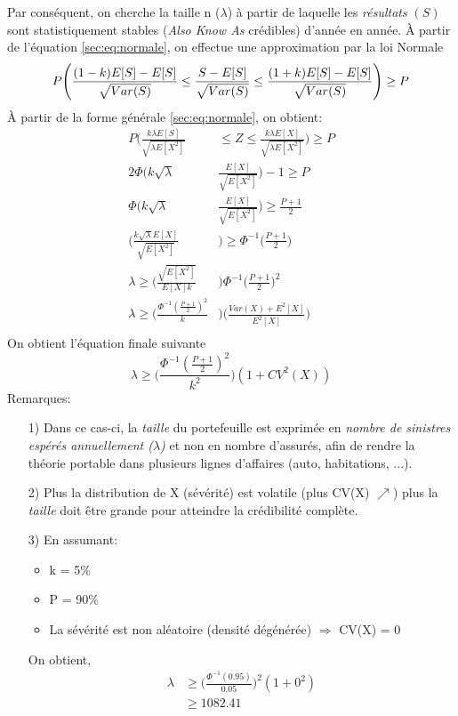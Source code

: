 Par conséquent, on cherche la taille n ($\lambda$) à partir de laquelle les \textit{résultats} $(S)$ sont statistiquement stables (\textit{Also Know As} crédibles) d'année en année. À partir de l'équation \ref{sec:eq:normale}, on effectue une approximation par la loi Normale
\begin{equation}
P\Bigg( \frac{(1 - k)E[S] - E[S]}{\sqrt{Var(S)}} \leq \frac{S - E[S]}{\sqrt{Var(S)}} \leq \frac{(1 + k)E[S] - E[S]}{\sqrt{Var(S)}}\Bigg) \geq P \\
\end{equation}
À partir de la forme générale \ref{sec:eq:normale}, on obtient:
\begin{align*}
P\Bigg( \frac{ k \lambda E[S]}{\sqrt{\lambda E[X^2]}} &\leq Z \leq \frac{k \lambda E[X]}{\sqrt{\lambda E[X^2]}}\Bigg) \geq P \\
2 \Phi\Bigg(k \sqrt{\lambda} &\frac{E[X]}{\sqrt{E[X^2]}}\Bigg) -1 \geq P \\
\Phi \Bigg( k \sqrt{\lambda}& \frac{E[X]}{\sqrt{E[X^2]}}\Bigg) \geq \frac{P + 1}{2}\\
\Bigg(\frac{k \sqrt{\lambda} E[X]}{\sqrt{E[X^2]}} &\Bigg) \geq \Phi^{-1}\Bigg(\frac{P + 1}{2}\Bigg)\\
\lambda \geq  \Bigg(\frac{\sqrt{E[X^2]}}{E[X] k } &\Bigg) \Phi^{-1}\Bigg(\frac{P + 1}{2}\Bigg)^2\\
\lambda  \geq \Bigg(\frac{\Phi^{-1}(\frac{P + 1}{2})^2}{k}& \Bigg) \Bigg(\frac{Var(X) + E^2[X]}{E^2[X]}\Bigg)\\
\end{align*}
On obtient l'équation finale suivante 
\begin{equation}
\lambda  \geq \Bigg(\frac{\Phi^{-1}(\frac{P + 1}{2})^2}{k^2} \Bigg) (1 + CV^2(X))
\end{equation}
Remarques:
\begin{itemize}
\item[1)]Dans ce cas-ci, la \textit{taille} du portefeuille est exprimée en \textit{nombre de sinistres espérés annuellement ($\lambda$)} et non en nombre d'assurés, afin de rendre la théorie portable dans plusieurs lignes d'affaires (auto, habitations, ...).
\item[2)]Plus la distribution de X (sévérité) est volatile (plus CV(X) $\nearrow$) plus la \textit{taille} doit être grande pour atteindre la crédibilité complète.
\item[3)]En assumant:
		\begin{itemize}
		\item k = 5\%
		\item P = 90\%
		\item La sévérité est non aléatoire (densité dégénérée) $\Rightarrow$ CV(X) = 0
		\end{itemize}
		On obtient,
		\begin{align*}
		\lambda &\geq \Bigg(\frac{\Phi^{-1}(0.95)}{0.05}\Bigg)^{2} (1 + 0^2)\\
		&\geq 1082.41
		\end{align*}
\end{itemize}


